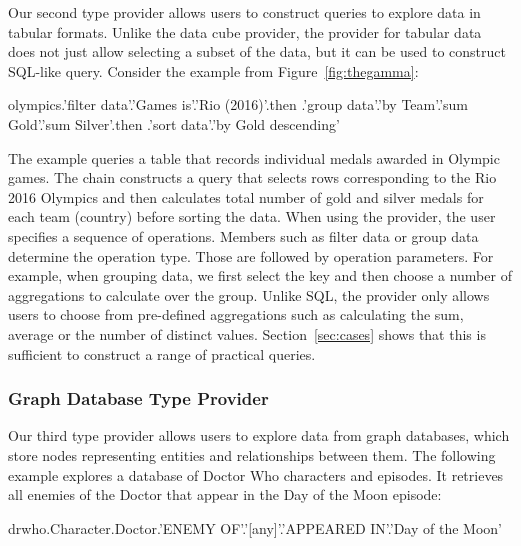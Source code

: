 \documentclass[manuscript,review,anonymous]{acmart}
\newcommand{\ikvd}[1]{{\fontfamily{zi4}\selectfont\small #1}}
\begin{document}
Our second type provider allows users to construct queries to explore data in tabular formats.
Unlike the data cube provider, the provider for tabular data does not just
allow selecting a subset of the data, but it can be used to construct SQL-like query. Consider
the example from Figure~\ref{fig:thegamma}:

\begin{thegamma}
olympics.'filter data'.'Games is'.'Rio (2016)'.then
  .'group data'.'by Team'.'sum Gold'.'sum Silver'.then
  .'sort data'.'by Gold descending'
\end{thegamma}

\noindent
The example queries a table that records individual medals awarded in Olympic games.
The chain constructs a query that selects rows corresponding to the Rio 2016 Olympics and then
calculates total number of gold and silver medals for each team (country) before sorting the data.
%
When using the provider, the user specifies a sequence of operations. Members such as
\ikvd{\textquotesingle filter data\textquotesingle} or \ikvd{\textquotesingle group data\textquotesingle}
determine the operation type. Those are followed by operation parameters. For example, when grouping
data, we first select the key and then choose a number of aggregations to calculate over the group.
Unlike SQL, the provider only allows users to choose from pre-defined aggregations such as
calculating the sum, average or the number of distinct values.
Section~\ref{sec:cases} shows that this is sufficient to construct a range of practical queries.



\subsubsection*{Graph Database Type Provider}
Our third type provider allows users to explore data from graph databases, which store
nodes representing entities and relationships between them.
The following example explores a database of Doctor Who characters and episodes. It retrieves
all enemies of the Doctor that appear in the Day of the Moon episode:

\begin{thegamma}
drwho.Character.Doctor.'ENEMY OF'.'[any]'.'APPEARED IN'.'Day of the Moon'
\end{thegamma}
\end{document}
